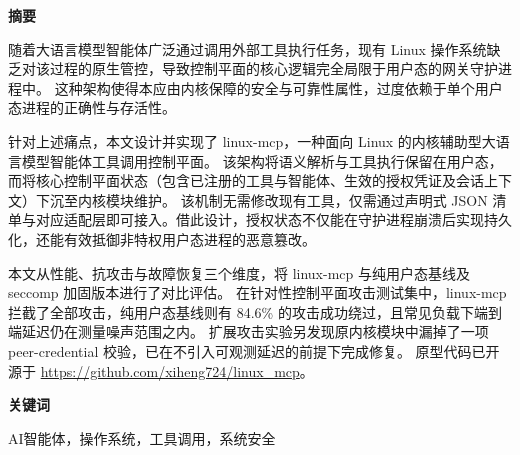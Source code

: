 \onehalfspacing
{\fontsize{16pt}{30pt}\selectfont \noindent\textbf{摘要}}
\vspace{0.7cm}
{\fontsize{12pt}{18pt}\selectfont

随着大语言模型智能体广泛通过调用外部工具执行任务，现有 Linux 操作系统缺乏对该过程的原生管控，导致控制平面的核心逻辑完全局限于用户态的网关守护进程中。
这种架构使得本应由内核保障的安全与可靠性属性，过度依赖于单个用户态进程的正确性与存活性。

针对上述痛点，本文设计并实现了 linux-mcp，一种面向 Linux 的内核辅助型大语言模型智能体工具调用控制平面。
该架构将语义解析与工具执行保留在用户态，而将核心控制平面状态（包含已注册的工具与智能体、生效的授权凭证及会话上下文）下沉至内核模块维护。
该机制无需修改现有工具，仅需通过声明式 JSON 清单与对应适配层即可接入。借此设计，授权状态不仅能在守护进程崩溃后实现持久化，还能有效抵御非特权用户态进程的恶意篡改。

本文从性能、抗攻击与故障恢复三个维度，将 linux-mcp 与纯用户态基线及 seccomp 加固版本进行了对比评估。
在针对性控制平面攻击测试集中，linux-mcp 拦截了全部攻击，纯用户态基线则有 84.6\% 的攻击成功绕过，且常见负载下端到端延迟仍在测量噪声范围之内。
扩展攻击实验另发现原内核模块中漏掉了一项 peer-credential 校验，已在不引入可观测延迟的前提下完成修复。
原型代码已开源于 \url{https://github.com/xiheng724/linux_mcp}。

}
\vspace{1.0cm}
{\fontsize{16pt}{30pt}\selectfont \noindent\textbf{关键词}}
\vspace{0.7cm}
{\fontsize{12pt}{18pt}\selectfont

AI智能体，操作系统，工具调用，系统安全

}

